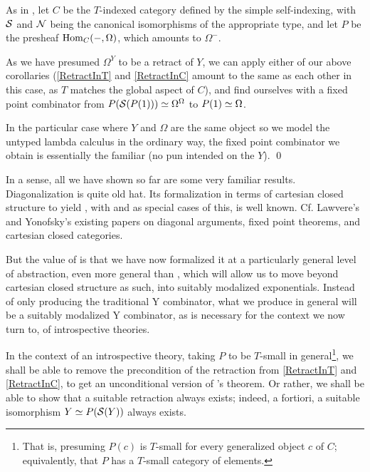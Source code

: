 As in , let $C$ be the $T$-indexed category defined by the simple self-indexing, with $\mathcal{S}$ and $\mathcal{N}$ being the canonical isomorphisms of the appropriate type, and let $P$ be the presheaf $\operatorname{Hom}_C(-, \Omega)$, which amounts to $\Omega^{-}$.

As we have presumed $\Omega^Y$ to be a retract of $Y$, we can apply either of our above corollaries (\cref{RetractInT} and \cref{RetractInC} amount to the same as each other in this case, as $T$ matches the global aspect of $C$), and find ourselves with a fixed point combinator from $P(\mathcal{S}(P(1))) \simeq \Omega^{\Omega}$ to $P(1) \simeq \Omega$. 

In the particular case where $Y$ and $\Omega$ are the same object so we model the untyped lambda calculus in the ordinary way, the fixed point combinator we obtain is essentially the familiar  (no pun intended on the $Y$). \qed
{}

In a sense, all we have shown so far are some very familiar results. Diagonalization is quite old hat. Its formalization in terms of cartesian closed structure to yield , with  and  as special cases of this, is well known. Cf. Lawvere's and Yonofsky's existing papers on diagonal arguments, fixed point theorems, and cartesian closed categories. 

But the value of  is that we have now formalized it at a particularly general level of abstraction, even more general than , which will allow us to move beyond cartesian closed structure as such, into suitably modalized exponentials. Instead of only producing the traditional Y combinator, what we produce in general will be a suitably modalized Y combinator, as is necessary for the context we now turn to, of introspective theories.

In the context of an introspective theory, taking $P$ to be $T$-small in general\footnote{That is, presuming $P(c)$ is $T$-small for every generalized object $c$ of $C$; equivalently, that $P$ has a $T$-small category of elements.}, we shall be able to remove the precondition of the retraction from \cref{RetractInT} and \cref{RetractInC}, to get an unconditional version of \Loeb's theorem. Or rather, we shall be able to show that a suitable retraction always exists; indeed, a fortiori, a suitable isomorphism $Y \simeq P(\mathcal{S}(Y))$ always exists.

